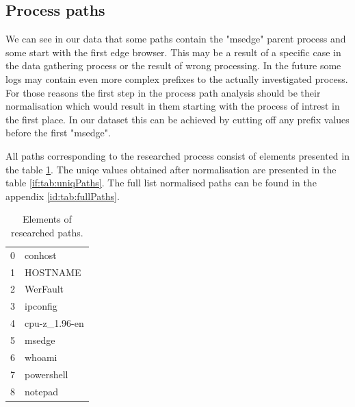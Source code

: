\documentclass[a4paper,twoside,12pt]{book}
\begin{document}
\subsection{Process paths}

We can see in our data that some paths contain the "msedge" parent process and some start with the first 
edge browser. This may be a result of a specific case in the data gathering process or the result of wrong 
processing. In the future some logs may contain even more complex prefixes to the actually investigated
process. For those reasons the first step in the process path analysis should be their normalisation which
would result in them starting with the process of intrest in the first place. In our dataset this can 
be achieved by cutting off any prefix values before the first "msedge".  

All paths corresponding to the researched process consist of elements presented in the table 
\ref{id:tab:pathElems}. The uniqe values obtained after normalisation are presented in the table 
\ref{if:tab:uniqPaths}. The full list normalised paths can be found in the appendix \ref{id:tab:fullPaths}.

\begin{table}
\centering
\caption{Elements of researched paths.}
\label{id:tab:pathElems}
\begin{tabular}{ll}
	\toprule
	0 &        conhost \\
	1 &       HOSTNAME \\
	2 &       WerFault \\
	3 &       ipconfig \\
	4 &  cpu-z\_1.96-en \\
	5 &         msedge \\
	6 &         whoami \\
	7 &     powershell \\
	8 &        notepad \\
	\bottomrule
\end{tabular}
\end{table}		
	
\end{document}

